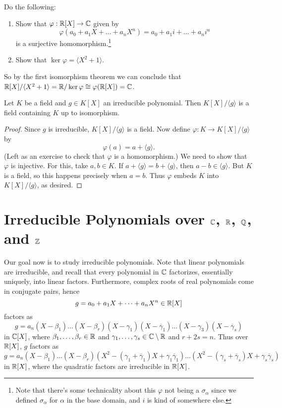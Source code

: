 \begin{exercise}
  Do the following:
  \begin{enumerate}
    \item Show that $\varphi : \mathbb{R}[X] \to \mathbb{C}$ given by
      \[
        \varphi (a_0 + a_1 X + \dots + a_n X^n) = a_0 + a_1 i + \dots + a_n i^n
      \]
      is a surjective homomorphism.\footnote{Note that there's some technicality about this $\varphi$ not being a $\sigma_{\alpha}$ since we defined $\sigma_{\alpha}$ for $\alpha$ in the base domain, and $i$ is kind of somewhere else.}
    \item Show that $\ker \varphi = \langle X^2 + 1 \rangle$.
  \end{enumerate}
  So by the first isomorphism theorem we can conclude
  that $\mathbb{R}[X] / \langle X^2 + 1 \rangle = \mathbb{R} / \ker \varphi \cong \varphi(\mathbb{R}[X]) = \mathbb{C}$.
\end{exercise}

\begin{theorem}
  Let $K$ be a field and $g \in K[X]$ an irreducible
  polynomial. Then $K[X] / \langle g \rangle$ is a field
  containing $K$ up to isomorphism.
\end{theorem}

\begin{proof}
  Since $g$ is irreducible, $K[X] / \langle g \rangle$
  is a field. Now define $\varphi : K \to K[X] / \langle g \rangle$ by
  \[
    \varphi (a) = a + \langle g \rangle.
  \]
  (Left as an exercise to check that $\varphi$ is a
  homomorphism.) We need to show that $\varphi$ is
  injective. For this, take $a, b \in K$. If
  $a + \langle g \rangle = b + \langle g \rangle$,
  then $a - b \in \langle g \rangle$. But $K$ is a field,
  so this happens precisely when $a = b$. Thus
  $\varphi$ embeds $K$ into $K[X] / \langle g \rangle$,
  as desired.
\end{proof}

\section{\texorpdfstring{Irreducible Polynomials over $\mathbb{C}$, $\mathbb{R}$, $\mathbb{Q}$, and $\mathbb{Z}$}{Irreducible Polynomials over C, R, Q, and Z}}
Our goal now is to study irreducible polynomials. Note
that linear polynomials are irreducible, and recall that
every polynomial in $\mathbb{C}$ factorizes, essentially
uniquely, into linear factors. Furthermore, complex roots
of real polynomials come in conjugate pairs, hence
\[
  g = a_0 + a_1 X + \dots + a_n X^n \in \mathbb{R}[X]
\]
factors as
\[g = a_n (X - \beta_1) \dots (X - \beta_r) (X - \gamma_1)(X - \overline{\gamma}_1) \dots (X - \gamma_3) (X - \overline{\gamma}_s)\]
in $\mathbb{C}[X]$, where $\beta_1, \dots, \beta_r \in \mathbb{R}$ and $\gamma_1, \dots, \gamma_s \in \mathbb{C} \setminus \mathbb{R}$ and
$r + 2s = n$. Thus over $\mathbb{R}[X]$, $g$ factors as
\[
  g = a_n (X - \beta_1) \dots (X - \beta_r) (X^2 - (\gamma_1 + \overline{\gamma}_1) X + \gamma_1 \overline{\gamma}_1) \dots (X^2 - (\gamma_s + \overline{\gamma}_s) X + \gamma_s \overline{\gamma}_s)
\]
in $\mathbb{R}[X]$, where the quadratic factors are irreducible
in $\mathbb{R}[X]$.

